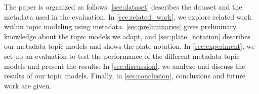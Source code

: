 The paper is organized as follows:
\autoref{sec:dataset} describes the dataset and the metadata used in the evaluation.
In \autoref{sec:related_work}, we explore related work within topic modeling using metadata.
\autoref{sec:preliminaries} gives preliminary knowledge about the topic models we adapt, and \autoref{sec:plate_notation} describes our metadata topic models and shows the plate notation.
In \autoref{sec:experiment}, we set up an evaluation to test the performance of the different metadata topic models and present the results.
In \autoref{sec:discussion}, we analyze and discuss the results of our topic models.
Finally, in \autoref{sec:conclusion}, conclusions and future work are given.
